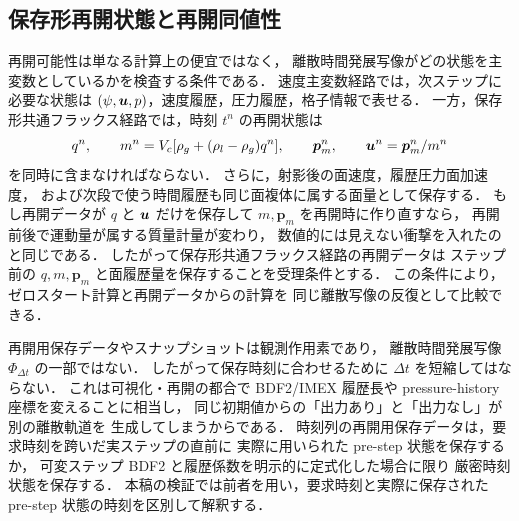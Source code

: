 \subsection{保存形再開状態と再開同値性}
\label{sec:conservative_restart_contract}

再開可能性は単なる計算上の便宜ではなく，
離散時間発展写像がどの状態を主変数としているかを検査する条件である．
速度主変数経路では，次ステップに必要な状態は
$(\psi,\bm{u},p)$，速度履歴，圧力履歴，格子情報で表せる．
一方，保存形共通フラックス経路では，時刻 $t^n$ の再開状態は
\[
  q^n,\qquad
  m^n=V_c[\rho_g+(\rho_l-\rho_g)q^n],\qquad
  \bm{p}_m^n,\qquad
  \bm{u}^n=\bm{p}_m^n/m^n
\]
を同時に含まなければならない．
さらに，射影後の面速度，履歴圧力面加速度，
および次段で使う時間履歴も同じ面複体に属する面量として保存する．
もし再開データが $q$ と $\bm{u}$ だけを保存して
$m,\bm{p}_m$ を再開時に作り直すなら，
再開前後で運動量が属する質量計量が変わり，
数値的には見えない衝撃を入れたのと同じである．
したがって保存形共通フラックス経路の再開データは
ステップ前の $q,m,\bm{p}_m$ と面履歴量を保存することを受理条件とする．
この条件により，ゼロスタート計算と再開データからの計算を
同じ離散写像の反復として比較できる．

再開用保存データやスナップショットは観測作用素であり，
離散時間発展写像 $\Phi_{\Delta t}$ の一部ではない．
したがって保存時刻に合わせるために $\Delta t$ を短縮してはならない．
これは可視化・再開の都合で BDF2/IMEX 履歴長や
pressure-history 座標を変えることに相当し，
同じ初期値からの「出力あり」と「出力なし」が別の離散軌道を
生成してしまうからである．
時刻列の再開用保存データは，要求時刻を跨いだ実ステップの直前に
実際に用いられた pre-step 状態を保存するか，
可変ステップ BDF2 と履歴係数を明示的に定式化した場合に限り
厳密時刻状態を保存する．
本稿の検証では前者を用い，要求時刻と実際に保存された
pre-step 状態の時刻を区別して解釈する．
